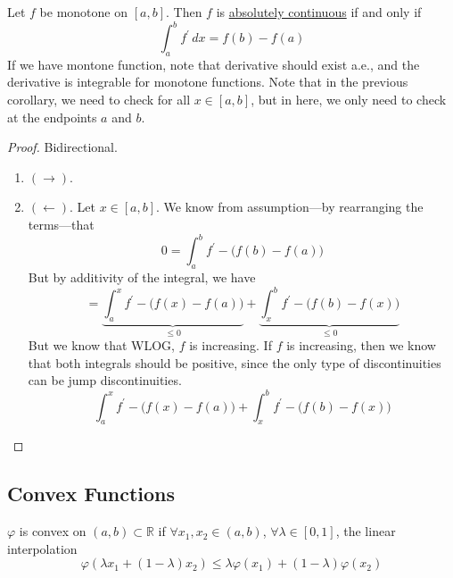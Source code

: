   \begin{corollary}
    \label{thm:ac-of-monotone-functions}
    Let $f$ be monotone on $[a, b]$. Then $f$ is \hyperref[def:absolutely-continuous-function]{absolutely continuous} if and only if 
    \begin{equation}
      \int_a^b f^\prime \,dx = f(b) - f(a)
    \end{equation}
    If we have montone function, note that derivative should exist a.e., and the derivative is integrable for monotone functions. Note that in the previous corollary, we need to check for all $x \in [a, b]$, but in here, we only need to check at the endpoints $a$ and $b$. 
  \end{corollary}
  \begin{proof}
    Bidirectional. 
    \begin{enumerate}
      \item $(\rightarrow)$. 
      \item $(\leftarrow)$. Let $x \in [a, b]$. We know from assumption---by rearranging the terms---that
      \begin{equation}
        0 = \int_a^b f^\prime - \big( f(b) - f(a) \big)
      \end{equation}
      But by additivity of the integral, we have 
      \begin{equation}
        = \underbrace{\int_a^x f^\prime - \big( f(x) - f(a) \big)}_{\leq 0} + \underbrace{\int_x^b f^\prime - \big( f(b) - f(x) \big)}_{\leq 0}
      \end{equation}
      But we know that WLOG, $f$ is increasing. If $f$ is increasing, then we know that both integrals should be positive, since the only type of discontinuities can be jump discontinuities. 
      \begin{equation}
        \int_a^x f^\prime - \big( f(x) - f(a) \big) + \int_x^b f^\prime - \big( f(b) - f(x) \big)
      \end{equation}

    \end{enumerate}
  \end{proof}

\subsection{Convex Functions} 

  \begin{definition}
    \label{def:convex-function}
    $\varphi$ is convex on $(a, b) \subset \mathbb{R}$ if $\forall x_1, x_2 \in (a, b)$, $\forall \lambda \in [0, 1]$, the linear interpolation 
    \begin{equation}
      \varphi (\lambda x_1 + (1 - \lambda) x_2) \leq \lambda \varphi(x_1) + (1 - \lambda) \varphi(x_2)
    \end{equation}
  \end{definition}

